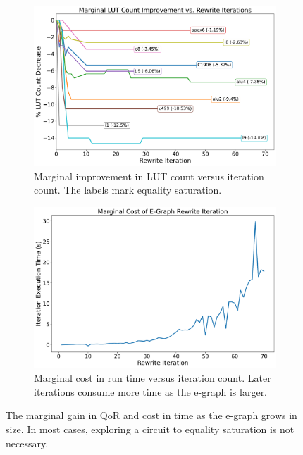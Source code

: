 \begin{figure}
    \begin{subfigure}{0.47\textwidth}
        \centering
        \includegraphics[width=\textwidth]{img/improvement.pdf}
        \caption{Marginal improvement in LUT count versus iteration count. The labels mark equality saturation.}\label{fig:marginal:improvement}
    \end{subfigure}
    \hfill\vspace{4mm}
    \begin{subfigure}{0.47\textwidth}
        \centering
        \includegraphics[width=\textwidth]{img/runtime_derivative.pdf}
        \caption{Marginal cost in run time versus iteration count. Later iterations consume more time as the e-graph is larger.}\label{fig:marginal:runtime}
    \end{subfigure}
    \caption{The marginal gain in QoR and cost in time as the e-graph grows in size. In most cases, exploring a circuit to equality saturation is not necessary.}\label{fig:marginal}
\end{figure}

